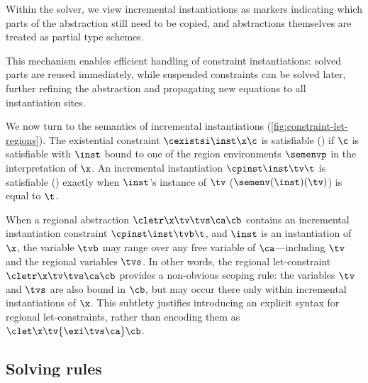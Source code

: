 \documentclass[acmsmall,screen,nonacm%
\Anonymous{,anonymous}{}%
\Final{}{,review}%
]{acmart}
\begin{document}

%
Within the solver, we view incremental instantiations as markers indicating
which parts of the abstraction still need to be copied, and abstractions
themselves are treated as partial type schemes.


This mechanism enables efficient handling of constraint instantiations: solved
parts are reused immediately, while suspended constraints can be solved later,
further refining the abstraction and propagating new equations to all
instantiation sites.


We now turn to the semantics of incremental instantiations
(\cref{fig:constraint-let-regions}). The existential constraint $\cexistsi
\inst \x \c$ is satisfiable () if $\c$ is satisfiable with
$\inst$ bound to one of the region environments $\semenvp$ in the
interpretation of $\x$.
%
An incremental instantiation $\cpinst \inst \tv \t$ is satisfiable
() exactly when $\inst$'s instance of $\tv$
(\ie $\semenv(\inst)(\tv)$) is equal to $\t$.


When a regional abstraction $\cletr \x \tv \tvs \ca \cb$ contains an
incremental instantiation constraint $\cpinst \inst \tvb \t$, and $\inst$ is
an instantiation of $\x$, the variable $\tvb$ may range over any free variable
of $\ca$---including $\tv$ and the regional variables $\tvs$. In other
words, the regional let-constraint ${\cletr \x \tv \tvs \ca \cb}$ provides a
non-obvious scoping rule: the variables $\tv$ and $\tvs$ are also bound in
$\cb$, but may occur there only within incremental instantiations of
$\x$. This subtlety justifies introducing an explicit syntax for regional
let-constraints, rather than encoding them as $\clet \x \tv {\exi \tvs \ca}
\cb$.

\subsection{Solving rules}

\end{document}
